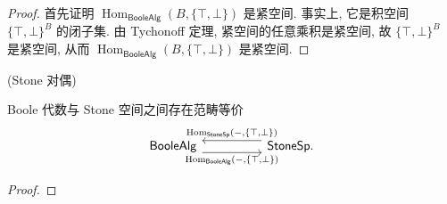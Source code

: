 \begin{proof}
	首先证明 $\operatorname{Hom}_{\mathsf {BooleAlg}}(B,\{\top,\bot\})$ 是紧空间. 事实上, 它是积空间 $\{\top,\bot\}^{B}$ 的闭子集. 由 Tychonoff 定理, 紧空间的任意乘积是紧空间, 故 $\{\top,\bot\}^{B}$ 是紧空间, 从而 $\operatorname{Hom}_{\mathsf {BooleAlg}}(B,\{\top,\bot\})$ 是紧空间.
	\todo{}
\end{proof}

\begin{prop}
	{(Stone 对偶)}
	
	Boole 代数与 Stone 空间之间存在范畴等价
	\[\begin{tikzcd}[ampersand replacement=\&]
		{\mathsf {BooleAlg}} \&\& {\mathsf {StoneSp}.}
		\arrow["{\operatorname{Hom}_{\mathsf {BooleAlg}}(-,\{\top,\bot\})}"', shift right=2, from=1-1, to=1-3]
		\arrow["{\operatorname{Hom}_{\mathsf {StoneSp}}(-,\{\top,\bot\})}"', shift right=2, from=1-3, to=1-1]
	\end{tikzcd}\]
\end{prop}

\begin{proof}
	
\end{proof}

\todo{}

